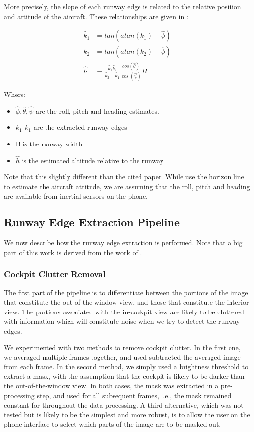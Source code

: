 \documentclass[letterpaper, conference]{IEEEtran}  %
\begin{document}
More precisely, the slope of each runway edge is related to the relative position and attitude of the aircraft. These relationships are given in \cite{Sasa2000}:

\begin{align}
\tilde{k_1} &= tan(atan(k_1) - \hat{\phi}) \\
\tilde{k_2} &= tan(atan(k_2) - \hat{\phi}) \\
\hat{h} &= \frac{\tilde{k_1} \tilde{k_2}}{\tilde{k_2} - \tilde{k_1}} \frac{cos(\hat{\theta})}{\cos(\hat{\psi})} B
\end{align}

Where:
\begin{itemize}
\item $\hat{\phi}, \hat{\theta}, \hat{\psi}$ are the roll, pitch and heading estimates.
\item $k_1, k_1$ are the extracted runway edges
\item B is the runway width
\item $\hat{h}$ is the estimated altitude relative to the runway
\end{itemize}

Note that this slightly different than the cited paper. While \citeauthor{Sasa2000} use the horizon line to estimate the aircraft attitude, we are assuming that the roll, pitch and heading are available from inertial sensors on the phone.

\subsection{Runway Edge Extraction Pipeline}
We now describe how the runway edge extraction is performed. Note that a big part of this work is derived from the work of \cite{Naidu2011}.
\subsubsection{\textbf{Cockpit Clutter Removal}}
\label{sec:pipeline:msk}
The first part of the pipeline is to differentiate between the portions of the image that constitute the out-of-the-window view, and those that constitute the interior view. The portions associated with the in-cockpit view are likely to be cluttered with information which will constitute noise when we try to detect the runway edges.

We experimented with two methods to remove cockpit clutter. In the first one, we averaged multiple frames together, and used subtracted the averaged image from each frame. In the second method, we simply used a brightness threshold to extract a mask, with the assumption that the cockpit is likely to be darker than the out-of-the-window view. In both cases, the mask was extracted in a pre-processing step, and used for all subsequent frames, i.e., the mask remained constant for throughout the data processing.
A third alternative, which was not tested but is likely to be the simplest and more robust, is to allow the user on the phone interface to select which parts of the image are to be masked out.
\end{document}
